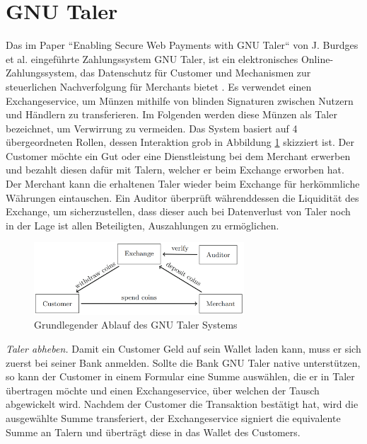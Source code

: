 \documentclass[11pt,a4paper]{scrreprt}
\begin{document}
\section{GNU Taler}
\label{subsec:gnu}
Das im Paper ``Enabling Secure Web Payments with GNU Taler`` von J. Burdges et al. eingeführte Zahlungssystem GNU Taler, ist ein elektronisches Online-Zahlungssystem, das Datenschutz für Customer und Mechanismen zur steuerlichen Nachverfolgung für Merchants bietet \cite{gnu-burdges2016enabling}. Es verwendet einen Exchangeservice, um Münzen mithilfe von blinden Signaturen zwischen Nutzern und Händlern zu transferieren. Im Folgenden werden diese Münzen als Taler bezeichnet, um Verwirrung zu vermeiden. Das System basiert auf 4 übergeordneten Rollen, dessen Interaktion grob in Abbildung \ref{fig:gnu_taler_overview} skizziert ist. Der Customer möchte ein Gut oder eine Dienstleistung bei dem Merchant erwerben und bezahlt diesen dafür mit Talern, welcher er beim Exchange erworben hat. Der Merchant kann die erhaltenen Taler wieder beim Exchange für herkömmliche Währungen eintauschen. Ein Auditor überprüft währenddessen die Liquidität des Exchange, um sicherzustellen, dass dieser auch bei Datenverlust von Taler noch in der Lage ist allen Beteiligten, Auszahlungen zu ermöglichen.

\begin{figure}[H]
    \centering
    \includegraphics[width=0.7\textwidth]{gnu_system_graphic.png}
    \caption{Grundlegender Ablauf des GNU Taler Systems \cite{gnu-burdges2016enabling}}
    \label{fig:gnu_taler_overview}
\end{figure}

\textit{Taler abheben.} Damit ein Customer Geld auf sein Wallet laden kann, muss er sich zuerst bei seiner Bank anmelden. Sollte die Bank GNU Taler native unterstützen, so kann der Customer in einem Formular eine Summe auswählen, die er in Taler übertragen möchte und einen Exchangeservice, über welchen der Tausch abgewickelt wird. Nachdem der Customer die Transaktion bestätigt hat, wird die ausgewählte Summe transferiert, der Exchangeservice signiert die equivalente Summe an Talern und überträgt diese in das Wallet des Customers.
\end{document}
